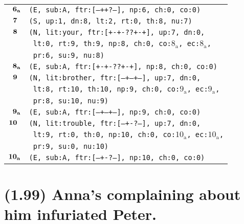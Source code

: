 \documentclass{article}
\begin{document}
\begin{minipage}{\textwidth}
{\begin{tabular}{|r|l|}
    ${\textbf{\textrm{6}}_{\textbf{\textrm{a}}}}$ & \texttt{\texttt{(E,~sub:A,~ftr:[---++?---],~np:6,~ch:0,~co:0)}} \\
    ${\textbf{\textrm{7}}_{\phantom{z}}}$ & \texttt{\texttt{(S,~up:1,~dn:8,~lt:2,~rt:0,~th:8,~nu:7)}} \\
    ${\textbf{\textrm{8}}_{\phantom{z}}}$ & \texttt{\texttt{(N,~lit:your,~ftr:[+-+-??+-+],~up:7,~dn:0,}} \\
    & \texttt{\texttt{~lt:0,~rt:9,~th:9,~np:8,~ch:0,~co:${\textrm{8}_{\textrm{a}}}$,~ec:${\textrm{8}_{\textrm{a}}}$,}} \\
    & \texttt{\texttt{~pr:6,~su:9,~nu:8)}} \\
    ${\textbf{\textrm{8}}_{\textbf{\textrm{a}}}}$ & \texttt{\texttt{(E,~sub:A,~ftr:[+-+-??+-+],~np:8,~ch:0,~co:0)}} \\
    ${\textbf{\textrm{9}}_{\phantom{z}}}$ & \texttt{\texttt{(N,~lit:brother,~ftr:[---+--+--],~up:7,~dn:0,}} \\
    & \texttt{\texttt{~lt:8,~rt:10,~th:10,~np:9,~ch:0,~co:${\textrm{9}_{\textrm{a}}}$,~ec:${\textrm{9}_{\textrm{a}}}$,}} \\
    & \texttt{\texttt{~pr:8,~su:10,~nu:9)}} \\
    ${\textbf{\textrm{9}}_{\textbf{\textrm{a}}}}$ & \texttt{\texttt{(E,~sub:A,~ftr:[---+--+--],~np:9,~ch:0,~co:0)}} \\
    ${\textbf{\textrm{10}}_{\phantom{z}}}$ & \texttt{\texttt{(N,~lit:trouble,~ftr:[---+-?---],~up:7,~dn:0,}} \\
    & \texttt{\texttt{~lt:9,~rt:0,~th:0,~np:10,~ch:0,~co:${\textrm{10}_{\textrm{a}}}$,~ec:${\textrm{10}_{\textrm{a}}}$,}} \\
    & \texttt{\texttt{~pr:9,~su:0,~nu:10)}} \\
    ${\textbf{\textrm{10}}_{\textbf{\textrm{a}}}}$ & \texttt{\texttt{(E,~sub:A,~ftr:[---+-?---],~np:10,~ch:0,~co:0)}} \\
    \hline
  \end{tabular}
  }
\end{minipage}
\bigbreak

\clearpage

%
%

\section*{(1.99) Anna's complaining about him infuriated Peter.}
\end{document}
